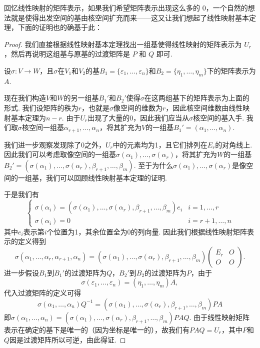 回忆线性映射的矩阵表示，如果我们希望矩阵表示出现这么多的 $0$，一个自然的想法就是使得出发空间的基由核空间扩充而来——这又让我们想起了线性映射基本定理，下面的证明也的确基于此：

\begin{proof}
    我们直接根据线性映射基本定理找出一组基使得线性映射的矩阵表示为 $U_r$，然后再说明这组基与原基的过渡矩阵是 $P$ 和 $Q$ 即可.

    设$\sigma:V\to W$，且$\sigma$在$V_1$和$V_2$的基$B_1=\{\varepsilon_1,\ldots,\varepsilon_n\}$和$B_2=\{\eta_1,\ldots,\eta_m\}$下的矩阵表示为$A$.

    现在我们构造$V$和$W$的另一组基$B_1'$和$B_2'$使得$\sigma$在这两组基下的矩阵表示为上面的形式. 我们设矩阵的秩为$r$，也就是$\sigma$像空间的维数为$r$，因此核空间维数由线性映射基本定理为$n-r$. 由于$U_r$出现了大量的0，因此我们应当从$\sigma$核空间的基入手. 我们取$\sigma$核空间一组基$\alpha_{r+1},\ldots,\alpha_n$，将其扩充为$V$的一组基$B_1'=(\alpha_1,\ldots,\alpha_n)$.

    我们进一步观察发现除了0之外，$U_r$中的元素均为1，且它们排列在$E_r$的对角线上. 因此我们可以考虑取像空间的一组基$\sigma(\alpha_1),\ldots,\sigma(\alpha_r)$，将其扩充为$W$的一组基$B_2'=(\sigma(\alpha_1),\ldots,\sigma(\alpha_r),\beta_{r+1},\ldots,\beta_m)$. 至于为什么$\sigma(\alpha_1),\ldots,\sigma(\alpha_r)$是像空间的一组基，我们可以回顾线性映射基本定理的证明.

    于是我们有
    \[\begin{cases}
            \sigma(\alpha_i)=(\sigma(\alpha_1),\ldots,\sigma(\alpha_r),\beta_{r+1},\ldots,\beta_m)e_i & i=1,\ldots,r   \\
            \sigma(\alpha_i)=0                                                                        & i=r+1,\ldots,n
        \end{cases}\]
    其中$e_i$表示第$i$个位置为1，其余位置全为0的列向量. 因此我们根据线性映射矩阵表示的定义得到
    \[\sigma(\alpha_1,\ldots,\alpha_r,\alpha_{r+1},\alpha_n)=(\sigma(\alpha_1),\ldots,\sigma(\alpha_r),\beta_{r+1},\ldots,\beta_m)\begin{pmatrix}
            E_r & O \\ O & O
        \end{pmatrix}.\]
    进一步假设$B_1$到$B_1'$的过渡矩阵为$Q$，$B_2'$到$B_2$的过渡矩阵为$P$，由于
    \[\sigma(\varepsilon_1,\ldots,\varepsilon_n)=(\eta_1,\ldots,\eta_m)A,\]
    代入过渡矩阵的定义可得
    \[\sigma(\alpha_1,\ldots,\alpha_n)Q^{-1}=(\sigma(\alpha_1),\ldots,\sigma(\alpha_r),\beta_{r+1},\ldots,\beta_m)PA\]
    即$\sigma(\alpha_1,\ldots,\alpha_n)=(\sigma(\alpha_1),\ldots,\sigma(\alpha_r),\beta_{r+1},\ldots,\beta_m)PAQ$. 由于线性映射矩阵表示在确定的基下是唯一的（因为坐标是唯一的），故我们有$PAQ=U_r$，其中$P$和$Q$因是过渡矩阵所以可逆，由此得证.
\end{proof}

